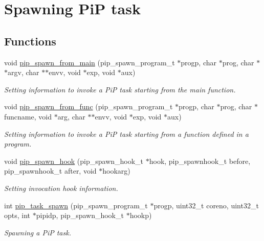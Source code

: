 \hypertarget{group__PiP-1-spawn}{\section{Spawning Pi\-P task}
\label{group__PiP-1-spawn}
}
\subsection*{Functions}
\begin{DoxyCompactItemize}
\item 
void \hyperlink{group__PiP-1-spawn_gad7708867e5370ae0a4ae71b16f446f16}{pip\-\_\-spawn\-\_\-from\-\_\-main} (pip\-\_\-spawn\-\_\-program\-\_\-t $\ast$progp, char $\ast$prog, char $\ast$$\ast$argv, char $\ast$$\ast$envv, void $\ast$exp, void $\ast$aux)
\begin{DoxyCompactList}\small\item\em Setting information to invoke a Pi\-P task starting from the main function. \end{DoxyCompactList}\item 
void \hyperlink{group__PiP-1-spawn_ga71d2d053e9c7153adc167e2cf1adf12e}{pip\-\_\-spawn\-\_\-from\-\_\-func} (pip\-\_\-spawn\-\_\-program\-\_\-t $\ast$progp, char $\ast$prog, char $\ast$funcname, void $\ast$arg, char $\ast$$\ast$envv, void $\ast$exp, void $\ast$aux)
\begin{DoxyCompactList}\small\item\em Setting information to invoke a Pi\-P task starting from a function defined in a program. \end{DoxyCompactList}\item 
void \hyperlink{group__PiP-1-spawn_ga1c3f1d9e029f68dbcfb7d78b7dfa1533}{pip\-\_\-spawn\-\_\-hook} (pip\-\_\-spawn\-\_\-hook\-\_\-t $\ast$hook, pip\-\_\-spawnhook\-\_\-t before, pip\-\_\-spawnhook\-\_\-t after, void $\ast$hookarg)
\begin{DoxyCompactList}\small\item\em Setting invocation hook information. \end{DoxyCompactList}\item 
int \hyperlink{group__PiP-1-spawn_gaf1fcc4cb85ec3eda734afe2beb0c6a36}{pip\-\_\-task\-\_\-spawn} (pip\-\_\-spawn\-\_\-program\-\_\-t $\ast$progp, uint32\-\_\-t coreno, uint32\-\_\-t opts, int $\ast$pipidp, pip\-\_\-spawn\-\_\-hook\-\_\-t $\ast$hookp)
\begin{DoxyCompactList}\small\item\em Spawning a Pi\-P task. \end{DoxyCompactList}\item 
$$
\end{DoxyCompactItemize}
